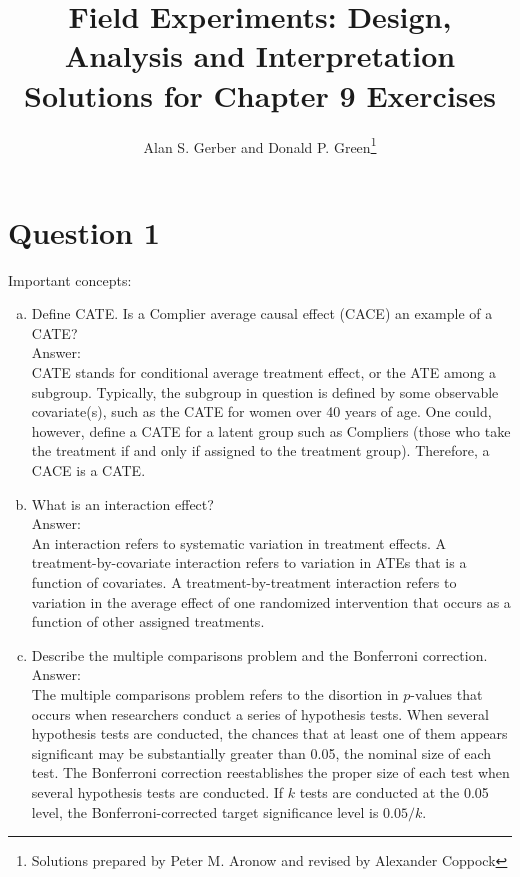 \documentclass[11pt,notitlepage]{article}\usepackage[]{graphicx}\usepackage[]{color}
\title{Field Experiments: Design, Analysis and Interpretation \\
Solutions for Chapter 9 Exercises}
\author{Alan S. Gerber and Donald P. Green\footnote{Solutions prepared by Peter M. Aronow and revised by Alexander Coppock}}
\date{\vspace{-5ex}}
\begin{document}
\maketitle


\section*{Question 1}
Important concepts:

\begin{enumerate}[a)]
\item Define CATE. Is a Complier average causal effect (CACE) an example of a CATE?\\
Answer:\\
CATE stands for conditional average treatment effect, or the ATE among a subgroup. Typically, the subgroup in question is defined by some observable covariate(s), such as the CATE for women over 40 years of age. One could, however, define a CATE for a latent group such as Compliers (those who take the treatment if and only if assigned to the treatment group). Therefore, a CACE is a CATE.

\item What is an interaction effect?\\
Answer:\\
An interaction refers to systematic variation in treatment effects. A treatment-by-covariate interaction refers to variation in ATEs that is a function of covariates. A treatment-by-treatment interaction refers to variation in the average effect of one randomized intervention that occurs as a function of other assigned treatments.

\item Describe the multiple comparisons problem and the Bonferroni correction.\\
Answer:\\
The multiple comparisons problem refers to the disortion in $p$-values that occurs when researchers conduct a series of hypothesis tests. When several hypothesis tests are conducted, the chances that at least one of them appears significant may be substantially greater than 0.05, the nominal size of each test. The Bonferroni correction reestablishes the proper size of each test when several hypothesis tests are conducted.   If $k$ tests are conducted at the 0.05 level, the Bonferroni-corrected target significance level is $0.05/k$.
\end{enumerate}
\end{document}
